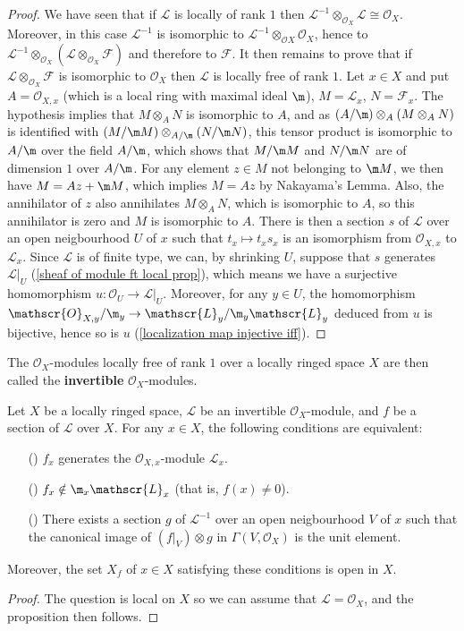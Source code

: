 \begin{proof}
We have seen that if $\mathscr{L}$ is locally of rank $1$ then $\mathscr{L}^{-1}\otimes_{\mathscr{O}_X}\mathscr{L}\cong\mathscr{O}_X$. Moreover, in this case $\mathscr{L}^{-1}$ is isomorphic to $\mathscr{L}^{-1}\otimes_{\mathscr{O}X}\mathscr{O}_X$, hence to $\mathscr{L}^{-1}\otimes_{\mathscr{O}_X}(\mathscr{L}\otimes_{\mathscr{O}_X}\mathscr{F})$ and therefore to $\mathscr{F}$. It then remains to prove that if $\mathscr{L}\otimes_{\mathscr{O}_X}\mathscr{F}$ is isomorphic to $\mathscr{O}_X$ then $\mathscr{L}$ is locally free of rank $1$. Let $x\in X$ and put $A=\mathscr{O}_{X,x}$ (which is a local ring with maximal ideal $\m$), $M=\mathscr{L}_x$, $N=\mathscr{F}_x$. The hypothesis implies that $M\otimes_AN$ is isomorphic to $A$, and as $(A/\m)\otimes_A(M\otimes_AN)$ is identified with $(M/\m M)\otimes_{A/\m}(N/\m N)$, this tensor product is isomorphic to $A/\m$ over the field $A/\m$, which shows that $M/\m M$ and $N/\m N$ are of dimension $1$ over $A/\m$. For any element $z\in M$ not belonging to $\m M$, we then have $M=Az+\m M$, which implies $M=Az$ by Nakayama's Lemma. Also, the annihilator of $z$ also annihilates $M\otimes_AN$, which is isomorphic to $A$, so this annihilator is zero and $M$ is isomorphic to $A$. There is then a section $s$ of $\mathscr{L}$ over an open neigbourhood $U$ of $x$ such that $t_x\mapsto t_xs_x$ is an isomorphism from $\mathscr{O}_{X,x}$ to $\mathscr{L}_x$. Since $\mathscr{L}$ is of finite type, we can, by shrinking $U$, suppose that $s$ generates $\mathscr{L}|_U$ (\cref{sheaf of module ft local prop}), which means we have a surjective homomorphism $u:\mathscr{O}_U\to\mathscr{L}|_U$. Moreover, for any $y\in U$, the homomorphism $\mathscr{O}_{X,y}/\m_y\to\mathscr{L}_y/\m_y\mathscr{L}_y$ deduced from $u$ is bijective, hence so is $u$ (\cref{localization map injective iff}).
\end{proof}
The $\mathscr{O}_X$-modules locally free of rank $1$ over a locally ringed space $X$ are then called the \textbf{invertible} $\mathscr{O}_X$-modules.
\begin{proposition}\label{sheaf of module invertible section zero iff}
Let $X$ be a locally ringed space, $\mathscr{L}$ be an invertible $\mathscr{O}_X$-module, and $f$ be a section of $\mathscr{L}$ over $X$. For any $x\in X$, the following conditions are equivalent:
\begin{itemize}
\item[(\rmnum{1})] $f_x$ generates the $\mathscr{O}_{X,x}$-module $\mathscr{L}_x$.
\item[(\rmnum{2})] $f_x\notin\m_x\mathscr{L}_x$ (that is, $f(x)\neq 0$).
\item[(\rmnum{3})] There exists a section $g$ of $\mathscr{L}^{-1}$ over an open neigbourhood $V$ of $x$ such that the canonical image of $(f|_V)\otimes g$ in $\Gamma(V,\mathscr{O}_X)$ is the unit element.
\end{itemize}
Moreover, the set $X_f$ of $x\in X$ satisfying these conditions is open in $X$.
\end{proposition}
\begin{proof}
The question is local on $X$ so we can assume that $\mathscr{L}=\mathscr{O}_X$, and the proposition then follows.
\end{proof}

